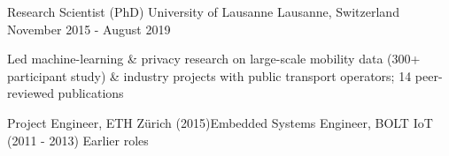 \begin{cventries}
\cventry
    {Research Scientist (PhD)}
    {University of Lausanne}
    {Lausanne, Switzerland}
    {November 2015 - August 2019}
    {
      \begin{cvitems}
        \item Led machine-learning \& privacy research on large-scale mobility data (300+ participant study) \& industry projects with public transport operators; 14 peer-reviewed publications
      \end{cvitems}
    }

\cventry
    {Project Engineer, ETH Zürich (2015){\enskip\cdotp\enskip}Embedded Systems Engineer, BOLT IoT (2011 - 2013)}
    {Earlier roles}
    {}
    {}
    {}

\end{cventries}

